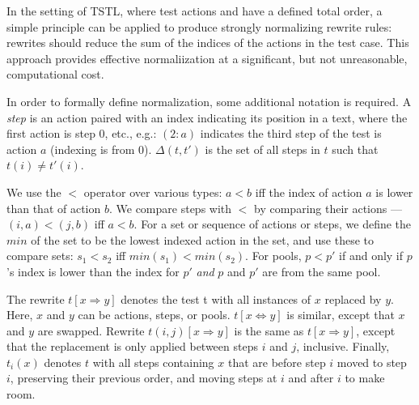 In the setting of TSTL, where test actions and have a defined total
order, a simple principle can be applied to produce strongly
normalizing rewrite rules: rewrites should reduce the sum of the
indices of the actions in the test case.  This approach
provides effective normaliization at a significant, but not
unreasonable, computational cost.

In order to formally define normalization, some additional notation is required.
A \emph{step} is an action paired with an index indicating its position in a text,
where the first action is step 0, etc., e.g.: $(2: a)$ indicates the
third step of the test is action $a$ (indexing is from 0). 
$\Delta(t,t')$ is the set of all steps in $t$ such that $t(i) \not= t'(i)$.

We use the $<$ operator over various types:
$a < b$ iff the index of action $a$ is lower
than that of action $b$.  We compare steps with $<$ by comparing their
actions --- $(i,a) < (j,b)$ iff $a < b$.  For a set or sequence of actions or steps, we define the $min$ of the
set to be the lowest indexed action in the set, and use
these to compare sets:  $s_1 < s_2$ iff $min(s_1) < min(s_2)$. For pools,
$p < p'$ if and only if $p$'s index is lower than the index for $p'$
\emph{and} $p$ and $p'$ are from the same pool.

The rewrite $t[x \Rightarrow y]$ denotes the test t with all instances of $x$
replaced by $y$.  Here, $x$ and $y$ can be actions, steps, or pools.
$t[x \Leftrightarrow y]$ is similar, except that $x$ and $y$ are
swapped.  Rewrite $t(i,j)[x \Rightarrow y]$ is the same as $t[x \Rightarrow
y]$, except that the replacement is only applied between steps $i$ and
$j$, inclusive.  Finally, $t_i(x)$ denotes $t$ with all steps
containing $x$ that are before step $i$ moved to step $i$, preserving
their previous order, and moving steps at $i$ and after $i$ to make room.


